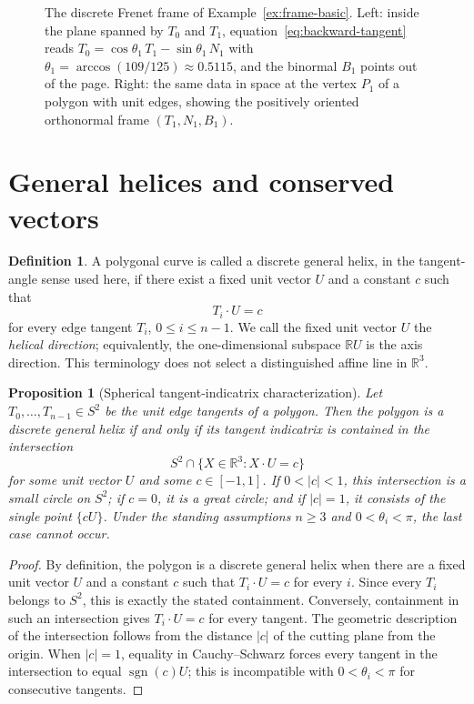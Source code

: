 \documentclass[10pt,a4paper]{amsart}
\newtheorem{proposition}[theorem]{Proposition}
\theoremstyle{definition}
\newtheorem{definition}[theorem]{Definition}
\theoremstyle{remark}
\numberwithin{equation}{section}
\begin{document}
\begin{figure}[!ht]
\centering
\resizebox{0.95\textwidth}{!}{}
\caption{The discrete Frenet frame of Example~\ref{ex:frame-basic}. Left: inside the plane spanned by $T_0$ and $T_1$, equation~\eqref{eq:backward-tangent} reads $T_0=\cos\theta_1\,T_1-\sin\theta_1\,N_1$ with $\theta_1=\arccos(109/125)\approx0.5115$, and the binormal $B_1$ points out of the page. Right: the same data in space at the vertex $P_1$ of a polygon with unit edges, showing the positively oriented orthonormal frame $(T_1,N_1,B_1)$.}
\label{fig:frenet-frame}
\end{figure}

\section{General helices and conserved vectors}

\begin{definition}\label{def:discrete-general-helix}
A polygonal curve is called a discrete general helix, in the tangent-angle sense used here, if there exist a fixed unit vector \(U\) and a constant \(c\) such that
\[
T_i\cdot U=c
\]
for every edge tangent $T_i$, $0\le i\le n-1$. We call the fixed unit vector $U$ the \emph{helical direction}; equivalently, the one-dimensional subspace $\mathbb R U$ is the axis direction. This terminology does not select a distinguished affine line in $\mathbb R^3$.
\end{definition}

\begin{proposition}[Spherical tangent-indicatrix characterization]\label{prop:spherical-characterization}
Let \(T_0,\ldots,T_{n-1}\in S^2\) be the unit edge tangents of a polygon.
Then the polygon is a discrete general helix if and only if its tangent
indicatrix is contained in the intersection
\[
S^2\cap\{X\in\mathbb R^3:X\cdot U=c\}
\]
for some unit vector \(U\) and some \(c\in[-1,1]\).  If \(0<|c|<1\),
this intersection is a small circle on \(S^2\); if \(c=0\), it is a
great circle; and if $|c|=1$, it consists of the single point $\{cU\}$.  Under the standing assumptions $n\ge3$ and $0<\theta_i<\pi$, the last case cannot occur.
\end{proposition}

\begin{proof}
By definition, the polygon is a discrete general helix when
there are a fixed unit vector \(U\) and a constant \(c\) such that
\(T_i\cdot U=c\) for every \(i\).  Since every \(T_i\) belongs to \(S^2\),
this is exactly the stated containment.  Conversely, containment in such
an intersection gives \(T_i\cdot U=c\) for every tangent.  The geometric
description of the intersection follows from the distance \(|c|\) of the
cutting plane from the origin.  When $|c|=1$, equality in Cauchy--Schwarz
forces every tangent in the intersection to equal $\operatorname{sgn}(c)U$;
this is incompatible with $0<\theta_i<\pi$ for consecutive tangents.
\end{proof}
\end{document}
